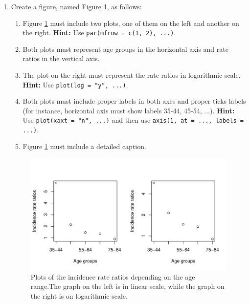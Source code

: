 \documentclass[10pt,a4paper,twoside]{article}\usepackage[]{graphicx}\usepackage[]{xcolor}
\makeatletter
\def\maxwidth{ %
  \ifdim\Gin@nat@width>\linewidth
    \linewidth
  \else
    \Gin@nat@width
  \fi
}
\newenvironment{knitrout}{}{} %
\newcommand{\Robject}[1]{\texttt{#1}}
\makeatother
\begin{document}
\begin{enumerate}
\begin{enumerate}
  \end{enumerate}
  \item Create a figure, named Figure \ref{fig:IRR_plot}, as follows:
  \begin{enumerate}
    \item Figure \ref{fig:IRR_plot} must include two plots, one of them on the left and another on the right. \textbf{Hint:} Use \Robject{par(mfrow = c(1, 2), ...)}.
    \item Both plots must represent age groups in the horizontal axis and rate ratios in the vertical axis.
    \item The plot on the right must represent the rate ratios in logarithmic scale. \textbf{Hint:} Use \Robject{plot(log = "y", ...)}.
    \item Both plots must include proper labels in both axes and proper ticks labels (for instance, horizontal axis must show labels 35-44, 45-54, ...). \textbf{Hint:} Use \Robject{plot(xaxt = "n", ...)} and then use \Robject{axis(1, at = ..., labels = ...)}.
    \item Figure \ref{fig:IRR_plot} must include a detailed caption.
  \end{enumerate}
\begin{knitrout}\footnotesize
{}\color{fgcolor}\begin{figure}
\includegraphics[width=\maxwidth]{figure/IRR_plot-1} \caption{\label{fig:IRR_plot}Plots of the incidence rate ratios depending on the age range.The graph on the left is in linear scale, while the graph on the right is on logarithmic scale.}\label{fig:IRR_plot}
\end{figure}


\end{knitrout}
\end{enumerate}
\end{document}
